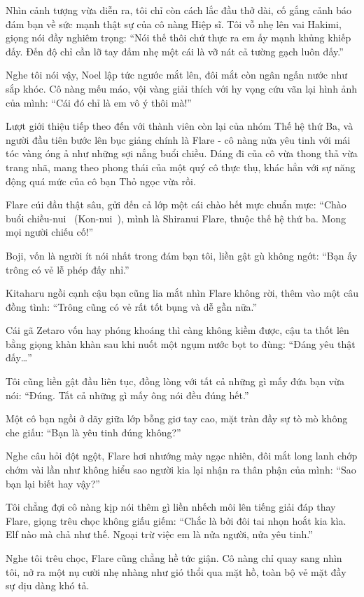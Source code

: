 \documentclass[../main.tex]{subfiles}
\begin{document}
Nhìn cảnh tượng vừa diễn ra, tôi chỉ còn cách lắc đầu thở dài, cố gắng cảnh báo đám bạn về sức mạnh thật sự của cô nàng Hiệp sĩ. Tôi vỗ nhẹ lên vai Hakimi, giọng nói đầy nghiêm trọng: ``Nói thế thôi chứ thực ra em ấy mạnh khủng khiếp đấy. Đến độ chỉ cần lỡ tay đấm nhẹ một cái là vỡ nát cả tường gạch luôn đấy.''

Nghe tôi nói vậy, Noel lập tức ngước mắt lên, đôi mắt còn ngân ngấn nước như sắp khóc. Cô nàng mếu máo, vội vàng giải thích với hy vọng cứu vãn lại hình ảnh của mình: ``Cái đó chỉ là em vô ý thôi mà!''

Lượt giới thiệu tiếp theo đến với thành viên còn lại của nhóm Thế hệ thứ Ba, và người đầu tiên bước lên bục giảng chính là Flare - cô nàng nửa yêu tinh với mái tóc vàng óng ả như những sợi nắng buổi chiều. Dáng đi của cô vừa thong thả vừa trang nhã, mang theo phong thái của một quý cô thực thụ, khác hẳn với sự năng động quá mức của cô bạn Thỏ ngọc vừa rồi.

Flare cúi đầu thật sâu, gửi đến cả lớp một cái chào hết mực chuẩn mực: ``Chào buổi chiều-nui~ (Kon-nui~), mình là Shiranui Flare, thuộc thế hệ thứ ba. Mong mọi người chiếu cố!''

Boji, vốn là người ít nói nhất trong đám bạn tôi, liền gật gù không ngớt: ``Bạn ấy trông có vẻ lễ phép đấy nhỉ.''

Kitaharu ngồi cạnh cậu bạn cũng lia mắt nhìn Flare không rời, thêm vào một câu đồng tình: ``Trông cũng có vẻ rất tốt bụng và dễ gần nữa.''

Cái gã Zetaro vốn hay phóng khoáng thì càng không kiềm được, cậu ta thốt lên bằng giọng khàn khàn sau khi nuốt một ngụm nước bọt to đùng: ``Đáng yêu thật đấy\dots''

Tôi cũng liền gật đầu liên tục, đồng lòng với tất cả những gì mấy đứa bạn vừa nói: ``Đúng. Tất cả những gì mấy ông nói đều đúng hết.''

Một cô bạn ngồi ở dãy giữa lớp bỗng giơ tay cao, mặt tràn đầy sự tò mò không che giấu: ``Bạn là yêu tinh đúng không?''

Nghe câu hỏi đột ngột, Flare hơi nhướng mày ngạc nhiên, đôi mắt long lanh chớp chớm vài lần như không hiểu sao người kia lại nhận ra thân phận của mình: ``Sao bạn lại biết hay vậy?''

Tôi chẳng đợi cô nàng kịp nói thêm gì liền nhếch môi lên tiếng giải đáp thay Flare, giọng trêu chọc không giấu giếm: ``Chắc là bởi đôi tai nhọn hoắt kia kìa. Elf nào mà chả như thế. Ngoại trừ việc em là nửa người, nửa yêu tinh.''

Nghe tôi trêu chọc, Flare cũng chẳng hề tức giận. Cô nàng chỉ quay sang nhìn tôi, nở ra một nụ cười nhẹ nhàng như gió thổi qua mặt hồ, toàn bộ vẻ mặt đầy sự dịu dàng khó tả.
\end{document}

